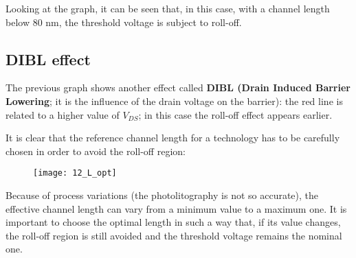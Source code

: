 \documentclass[a4paper, 12pt, twoside, openright]{report}
\begin{document}
Looking at the graph, it can be seen that, in this case, with a channel length below 80 nm, the threshold voltage is subject to roll-off. 

\newpage

\subsection{DIBL effect}

The previous graph shows another effect called \textbf{DIBL (Drain Induced Barrier Lowering}; it is the influence of the drain voltage on the barrier): the red line is related to a higher value of $V_{DS}$; in this case the roll-off effect appears earlier.

It is clear that the reference channel length for a technology has to be carefully chosen in order to avoid the roll-off region:

	\begin{figure}[H]
	\centering
	\texttt{[image: 12\_L\_opt]}
	\caption{}
	\label{}
	\end{figure}

Because of process variations (the photolitography is not so accurate), the effective channel length can vary from a minimum value to a maximum one. It is important to choose the optimal length in such a way that, if its value changes, the roll-off region is still avoided and the threshold voltage remains the nominal one.
\end{document}
